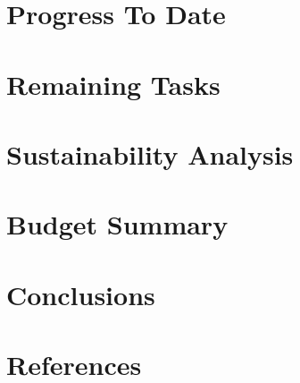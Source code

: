 \documentclass[a4paper,12pt]{article}
\begin{document}
\clearpage

\section{Progress To Date}

\section{Remaining Tasks}

\section{Sustainability Analysis}

\section{Budget Summary}

\section{Conclusions}

\section{References}
\end{document}

